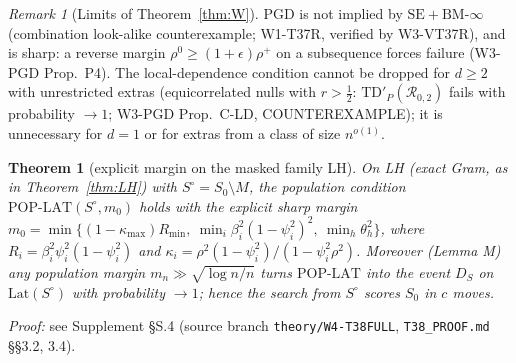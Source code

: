 \documentclass[11pt]{article}
\newtheorem{thmpart}{Theorem}[theorem]
\theoremstyle{definition}
\theoremstyle{remark}
\newtheorem{remark}{Remark}
\newcommand{\Sz}{S_0}
\newcommand{\cR}{\mathcal R}
\newcommand{\Lat}{\mathrm{Lat}}
\begin{document}
\begin{remark}[Limits of Theorem~\ref{thm:W}]\label{rem:Wlimits}
PGD is not implied by $\mathrm{SE}+\mathrm{BM}\text{-}\infty$ (combination look-alike counterexample; W1-T37R, verified by W3-VT37R), and is sharp: a
reverse margin $\rho^0\ge(1+\epsilon)\rho^+$ on a subsequence forces failure (W3-PGD Prop.~P4). The local-dependence condition cannot be dropped
for $d\ge2$ with unrestricted extras (equicorrelated nulls with $r>\tfrac12$: $\mathrm{TD}'_P(\cR_{0,2})$ fails with probability $\to1$; W3-PGD Prop.~C-LD,
COUNTEREXAMPLE); it is unnecessary for $d=1$ or for extras from a class of size $n^{o(1)}$.
\end{remark}

\begin{thmpart}[explicit margin on the masked family LH]\label{prop:LHLAT}
On LH (exact Gram, as in Theorem~\ref{thm:LH}) with $S^\circ=\Sz\setminus M$, the population condition $\mathrm{POP\text{-}LAT}(S^\circ,m_0)$ holds with the explicit
sharp margin $m_0=\min\{(1-\kappa_{\max})R_{\min},\ \min_i\beta_i^2(1-\psi_i^2)^2,\ \min_h\theta_h^2\}$, where
$R_i=\beta_i^2\psi_i^2(1-\psi_i^2)$ and $\kappa_i=\rho^2(1-\psi_i^2)/(1-\psi_i^2\rho^2)$. Moreover (Lemma M) any population margin $m_n\gg\sqrt{\log n/n}$
turns $\mathrm{POP\text{-}LAT}$ into the event $D_S$ on $\Lat(S^\circ)$ with probability $\to1$; hence the search from $S^\circ$ scores $\Sz$ in $c$ moves.
\end{thmpart}
\noindent\emph{Proof:} see Supplement \S S.4 (source branch \texttt{theory/W4-T38FULL}, \texttt{T38\_PROOF.md} \S\S3.2, 3.4).
\end{document}
